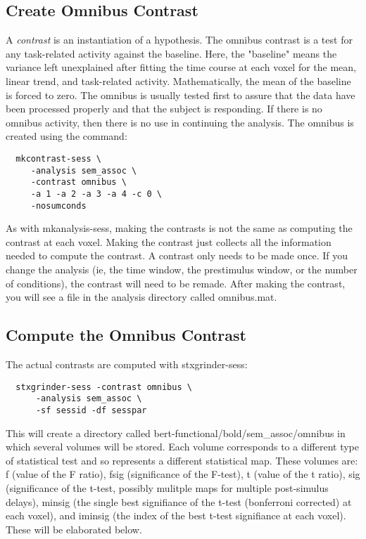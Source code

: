 \documentclass[12pt]{article}
\begin{document}
\subsection{Create Omnibus Contrast}
\label{mkomnibus.sec}

A {\em contrast} is an instantiation of a hypothesis.  The omnibus
contrast is a test for any task-related activity against the
baseline. Here, the "baseline" means the variance left unexplained
after fitting the time course at each voxel for the mean, linear
trend, and task-related activity.  Mathematically, the mean of the
baseline is forced to zero. The omnibus is usually tested first to
assure that the data have been processed properly and that the subject
is responding. If there is no omnibus activity, then there is no use
in continuing the analysis. The omnibus is created using the command:

\begin{verbatim}
  mkcontrast-sess \
     -analysis sem_assoc \
     -contrast omnibus \
     -a 1 -a 2 -a 3 -a 4 -c 0 \
     -nosumconds
\end{verbatim}

As with mkanalysis-sess, making the contrasts is not the same as
computing the contrast at each voxel. Making the contrast just
collects all the information needed to compute the contrast. A
contrast only needs to be made once. If you change the analysis (ie,
the time window, the prestimulus window, or the number of conditions),
the contrast will need to be remade. After making the contrast, you
will see a file in the analysis directory called omnibus.mat.

\subsection{Compute the Omnibus Contrast}

The actual contrasts are computed with stxgrinder-sess:

\begin{verbatim}
  stxgrinder-sess -contrast omnibus \
      -analysis sem_assoc \
      -sf sessid -df sesspar 
\end{verbatim}

This will create a directory called
bert-functional/bold/sem\_assoc/omnibus in which several volumes will
be stored. Each volume corresponds to a different type of statistical
test and so represents a different statistical map. These volumes are:
f (value of the F ratio), fsig (significance of the F-test), t (value
of the t ratio), sig (significance of the t-test, possibly mulitple
maps for multiple post-simulus delays), minsig (the single best
signifiance of the t-test (bonferroni corrected) at each voxel), and
iminsig (the index of the best t-test signifiance at each
voxel). These will be elaborated below.
\end{document}
